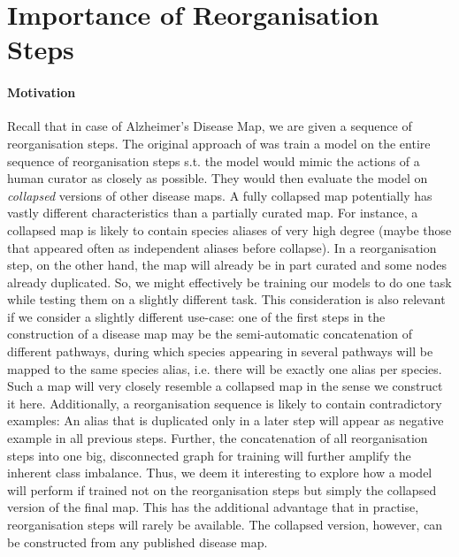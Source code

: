 \documentclass[
	fontsize=10pt, %
	twoside=false, %
	secnumdepth=1, %
  toc=indentunnumbered %
]{kaobook}
\begin{document}


\section{Importance of Reorganisation Steps}
\paragraph{Motivation} Recall that in case of Alzheimer's Disease Map, we are
given a sequence of reorganisation steps. The original approach of \nielsen was
train a model on the entire sequence of reorganisation steps s.t. the model
would mimic the actions of a human curator as closely as possible. They would
then evaluate the model on \textit{collapsed} versions of other disease maps.
%
A fully collapsed map potentially has vastly different characteristics than a
partially curated map. For instance, a collapsed map is likely to contain
species aliases of very high degree (maybe those that appeared often as
independent aliases before collapse). In a reorganisation step, on the other
hand, the map will already be in part curated and some nodes already duplicated.
%
So, we might effectively be training our models to do one task while testing
them on a slightly different task.
%
This consideration is also relevant if we consider a slightly different
use-case: one of the first steps in the construction of a disease map may be the
semi-automatic concatenation of different pathways, during which species
appearing in several pathways will be mapped to the same species alias, i.e.
there will be exactly one alias per species. Such a map will very closely
resemble a collapsed map in the sense we construct it here.
%
Additionally, a reorganisation sequence is likely to contain contradictory
examples: An alias that is duplicated only in a later step will appear as
negative example in all previous steps. Further, the concatenation of all
reorganisation steps into one big, disconnected graph for training
will further amplify the inherent class imbalance.
%
Thus, we deem it interesting to explore how a model will perform if trained not
on the reorganisation steps but simply the collapsed version of the final map.
%
This has the additional advantage that in practise, reorganisation steps will
rarely be available. The collapsed version, however, can be constructed from any
published disease map.
\end{document}
